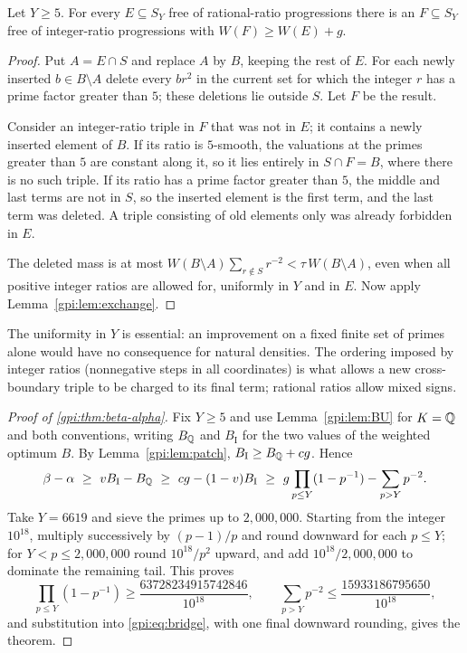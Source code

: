 \begin{lemma}\label{gpi:lem:patch}
Let $Y\ge5$. For every $E\subseteq S_Y$ free of rational-ratio progressions there is an
$F\subseteq S_Y$ free of integer-ratio progressions with $W(F)\ge W(E)+g$.
\end{lemma}

\begin{proof}
Put $A=E\cap S$ and replace $A$ by $B$, keeping the rest of $E$. For each newly inserted
$b\in B\setminus A$ delete every $br^2$ in the current set for which the integer $r$ has a
prime factor greater than $5$; these deletions lie outside $S$. Let $F$ be the result.

Consider an integer-ratio triple in $F$ that was not in $E$; it contains a newly inserted
element of $B$. If its ratio is $5$-smooth, the valuations at the primes greater than $5$ are
constant along it, so it lies entirely in $S\cap F=B$, where there is no such triple. If its
ratio has a prime factor greater than $5$, the middle and last terms are not in $S$, so the
inserted element is the first term, and the last term was deleted. A triple consisting of
old elements only was already forbidden in $E$.

The deleted mass is at most $W(B\setminus A)\sum_{r\notin S}r^{-2}<\tau\,W(B\setminus A)$,
even when all positive integer ratios are allowed for, uniformly in $Y$ and in $E$. Now apply
Lemma~\ref{gpi:lem:exchange}.
\end{proof}

The uniformity in $Y$ is essential: an improvement on a fixed finite set of primes alone
would have no consequence for natural densities. The ordering imposed by integer ratios
(nonnegative steps in all coordinates) is what allows a new cross-boundary triple to be
charged to its final term; rational ratios allow mixed signs.

\begin{proof}[Proof of \cref{gpi:thm:beta-alpha}]
Fix $Y\ge5$ and use Lemma~\ref{gpi:lem:BU} for $K=\mathbb{Q}$ and both conventions, writing $B_{\mathbb{Q}}$ and
$B_{\mathrm I}$ for the two values of the weighted optimum $B$. By Lemma~\ref{gpi:lem:patch},
$B_{\mathrm I}\ge B_{\mathbb{Q}}+cg$. Hence
\begin{equation}\label{gpi:eq:bridge}
 \beta-\alpha\ \ge\ vB_{\mathrm I}-B_{\Q}\ \ge\ cg-(1-v)B_{\mathrm I}\ \ge\
 g\prod_{p\le Y}(1-p^{-1})-\sum_{p>Y}p^{-2}.
\end{equation}
Take $Y=6619$ and sieve the primes up to $2{,}000{,}000$. Starting from the integer
$10^{18}$, multiply successively by $(p-1)/p$ and round downward for each $p\le Y$; for
$Y<p\le2{,}000{,}000$ round $10^{18}/p^2$ upward, and add $10^{18}/2{,}000{,}000$ to dominate
the remaining tail. This proves
\[
 \prod_{p\le Y}(1-p^{-1})\ge\frac{63728234915742846}{10^{18}},\qquad
 \sum_{p>Y}p^{-2}\le\frac{15933186795650}{10^{18}},
\]
and substitution into \eqref{gpi:eq:bridge}, with one final downward rounding, gives the
theorem.
\end{proof}

